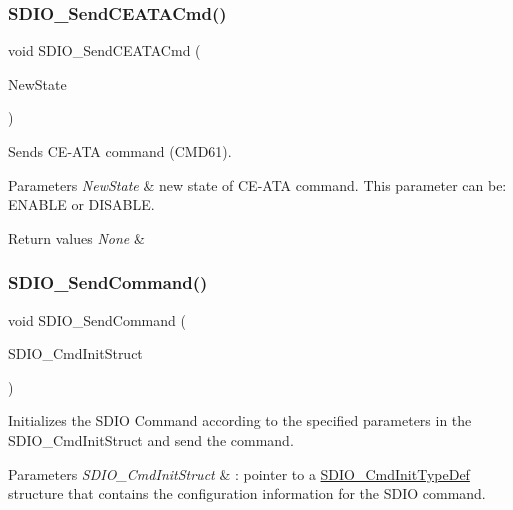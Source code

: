 \subsubsection{\texorpdfstring{SDIO\_SendCEATACmd()}{SDIO\_SendCEATACmd()}}
{\footnotesize\ttfamily void S\+D\+I\+O\+\_\+\+Send\+C\+E\+A\+T\+A\+Cmd (\begin{DoxyParamCaption}\item[{\mbox{\hyperlink{group___exported__types_gac9a7e9a35d2513ec15c3b537aaa4fba1}{Functional\+State}}}]{New\+State }\end{DoxyParamCaption})}



Sends C\+E-\/\+A\+TA command (C\+M\+D61). 


\begin{DoxyParams}{Parameters}
{\em New\+State} & new state of C\+E-\/\+A\+TA command. This parameter can be\+: E\+N\+A\+B\+LE or D\+I\+S\+A\+B\+LE. \\
\hline
\end{DoxyParams}

\begin{DoxyRetVals}{Return values}
{\em None} & \\
\hline
\end{DoxyRetVals}
\mbox{\label{group___s_d_i_o___private___functions_ga7117d2f702703f6c0a66bc07707cab23}} 
\subsubsection{\texorpdfstring{SDIO\_SendCommand()}{SDIO\_SendCommand()}}
{\footnotesize\ttfamily void S\+D\+I\+O\+\_\+\+Send\+Command (\begin{DoxyParamCaption}\item[{\mbox{\hyperlink{struct_s_d_i_o___cmd_init_type_def}{S\+D\+I\+O\+\_\+\+Cmd\+Init\+Type\+Def}} $\ast$}]{S\+D\+I\+O\+\_\+\+Cmd\+Init\+Struct }\end{DoxyParamCaption})}



Initializes the S\+D\+IO Command according to the specified parameters in the S\+D\+I\+O\+\_\+\+Cmd\+Init\+Struct and send the command. 


\begin{DoxyParams}{Parameters}
{\em S\+D\+I\+O\+\_\+\+Cmd\+Init\+Struct} & \+: pointer to a \mbox{\hyperlink{struct_s_d_i_o___cmd_init_type_def}{S\+D\+I\+O\+\_\+\+Cmd\+Init\+Type\+Def}} structure that contains the configuration information for the S\+D\+IO command. \\
\hline
\end{DoxyParams}

